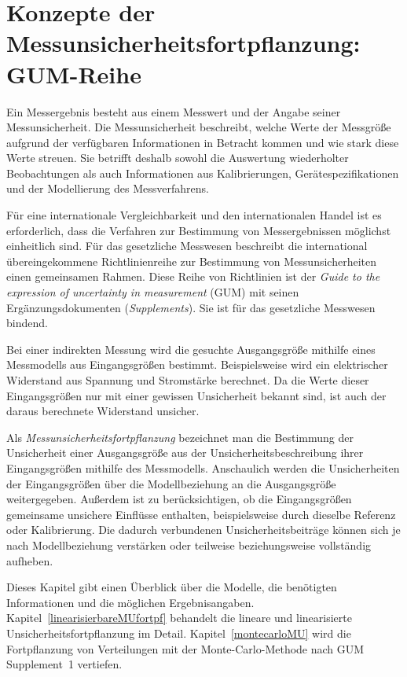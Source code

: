 \section{Konzepte der Messunsicherheitsfortpflanzung: GUM-Reihe}
\label{konzepteMUfortpflanzung}

Ein Messergebnis besteht aus einem Messwert und der Angabe seiner
Messunsicherheit. Die Mess\-un\-sicher\-heit beschreibt, welche Werte der Messgröße aufgrund der verfügbaren Informationen in Betracht kommen und wie stark diese Werte streuen. Sie betrifft deshalb sowohl die Auswertung wiederholter Beobachtungen als auch Informationen aus Kalibrierungen, Gerätespezifikationen und der Modellierung des Messverfahrens.


Für eine internationale Vergleichbarkeit und den internationalen Handel ist es erforderlich, dass die Verfahren zur Bestimmung von Messergebnissen möglichst einheitlich sind.
Für das gesetzliche Messwesen beschreibt die international übereingekommene Richtlinienreihe zur Bestimmung von Messunsicherheiten einen gemeinsamen Rahmen. Diese Reihe von Richtlinien ist der \textsl{Guide to the expression of uncertainty in measurement} (GUM) mit seinen Ergänzungsdokumenten (\textsl{Supplements}). Sie ist für das gesetzliche Messwesen bindend.

Bei einer indirekten Messung wird die gesuchte Ausgangsgröße mithilfe
eines Messmodells aus Eingangsgrößen bestimmt. Beispielsweise wird
ein elektrischer Widerstand aus Spannung und Stromstärke berechnet.
Da die Werte dieser Eingangsgrößen nur mit einer gewissen Unsicherheit
bekannt sind, ist auch der daraus berechnete Widerstand unsicher.

Als \textsl{Messunsicherheitsfortpflanzung} bezeichnet man die Bestimmung
der Unsicherheit einer Ausgangsgröße aus der Unsicherheitsbeschreibung
ihrer Eingangsgrößen mithilfe des Messmodells. Anschaulich werden die
Unsicherheiten der Eingangsgrößen über die Modellbeziehung an die
Ausgangsgröße weitergegeben. Außerdem ist zu berücksichtigen, ob die
Eingangsgrößen gemeinsame unsichere Einflüsse enthalten, beispielsweise
durch dieselbe Referenz oder Kalibrierung. Die dadurch verbundenen
Unsicherheitsbeiträge können sich je nach Modellbeziehung verstärken
oder teilweise beziehungsweise vollständig aufheben.

Dieses Kapitel gibt einen Überblick über die Modelle, die benötigten Informationen und die möglichen Ergebnisangaben. Kapitel~\ref{linearisierbareMUfortpf} behandelt die lineare und
linearisierte Unsicherheitsfortpflanzung im Detail.
Kapitel~\ref{montecarloMU} wird die Fortpflanzung von Verteilungen mit der Monte-Carlo-Methode nach GUM Supplement~1 vertiefen.

